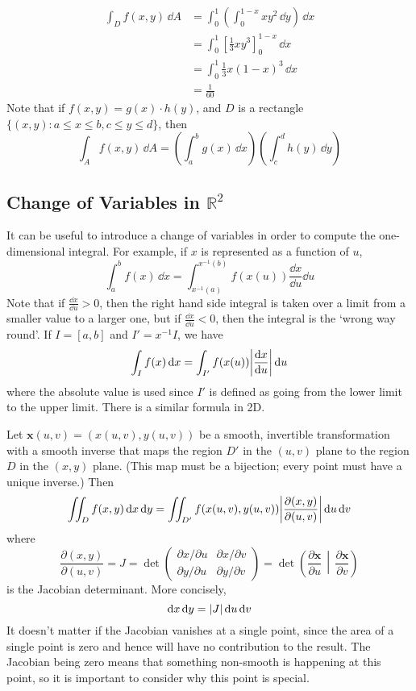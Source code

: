 \documentclass{article}
\begin{document}
\begin{align*}
    \int_D f(x, y) \,\dd A & = \int_0^1 \left( \int_0^{1-x} xy^2 \,\dd y \right) \,\dd x \\
                           & = \int_0^1 \left[ \frac{1}{3} xy^3 \right]_0^{1-x} \,\dd x  \\
                           & = \int_0^1 \frac{1}{3} x(1-x)^3 \,\dd x                     \\
                           & = \frac{1}{60}
\end{align*}
Note that if $f(x, y) = g(x) \cdot h(y)$, and $D$ is a rectangle $\{ (x, y) \colon a \leq x \leq b, c \leq y \leq d \}$, then
\[ \int_A f(x, y) \,\dd A = \left( \int_a^b g(x) \,\dd x \right)\left( \int_c^d h(y) \,\dd y \right) \]

\subsection{Change of Variables in $\mathbb R^2$}
It can be useful to introduce a change of variables in order to compute the one-dimensional integral. For example, if $x$ is represented as a function of $u$,
\[ \int_a^b f(x) \,\dd x = \int_{x^{-1}(a)}^{x^{-1}(b)} f(x(u)) \frac{\dd x}{\dd u}\dd u \]
Note that if $\frac{\dd x}{\dd u} > 0$, then the right hand side integral is taken over a limit from a smaller value to a larger one, but if $\frac{\dd x}{\dd u} < 0$, then the integral is the `wrong way round'. If $I = [a,b]$ and $I' = x^{-1} I$, we have
\[ \int_I f(x) \,\dd x = \int_{I'} f(x(u)) \abs{\frac{\dd x}{\dd u}} \,\dd u \]
where the absolute value is used since $I'$ is defined as going from the lower limit to the upper limit. There is a similar formula in 2D.
\begin{proposition}
    Let $\bm x(u, v) = (x(u, v), y(u, v))$ be a smooth, invertible transformation with a smooth inverse that maps the region $D'$ in the $(u, v)$ plane to the region $D$ in the $(x, y)$ plane. (This map must be a bijection; every point must have a unique inverse.) Then
    \[ \iint_D f(x, y) \,\dd x \,\dd y = \iint_{D'} f(x(u, v), y(u, v)) \abs{\frac{\partial (x, y)}{\partial (u, v)}}\,\dd u \,\dd v \]
    where
    \[ \frac{\partial (x, y)}{\partial (u, v)} = J = \det \begin{pmatrix}
            \partial x / \partial u & \partial x / \partial v \\
            \partial y / \partial u & \partial y / \partial v
        \end{pmatrix} = \det \left( \frac{\partial \bm x}{\partial u} \,\middle|\, \frac{\partial \bm x}{\partial v} \right) \]
    is the Jacobian determinant. More concisely,
    \[ \dd x \, \dd y = \abs{J} \, \dd u \, \dd v \]
    It doesn't matter if the Jacobian vanishes at a single point, since the area of a single point is zero and hence will have no contribution to the result. The Jacobian being zero means that something non-smooth is happening at this point, so it is important to consider why this point is special.
\end{proposition}
\end{document}
